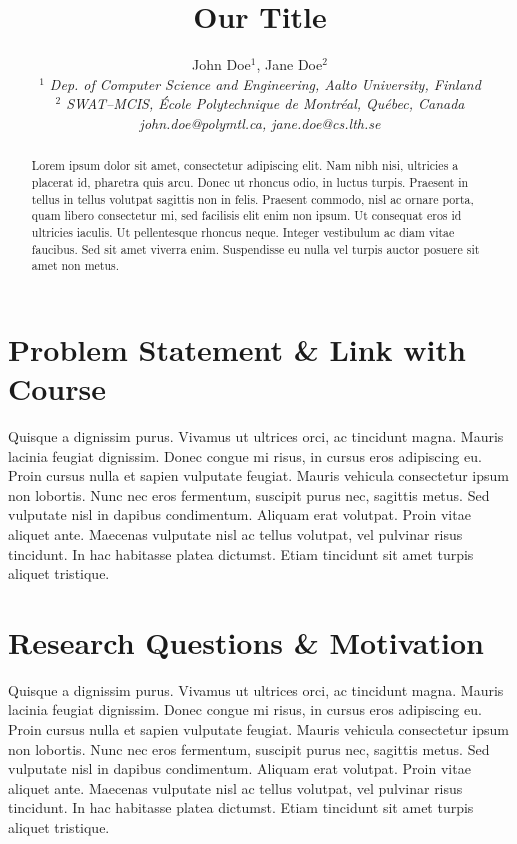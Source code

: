 \documentclass[10pt, conference]{IEEEtran}
\title{Our Title}
\author{John Doe$^{1}$, Jane Doe$^{2}$
    \\
    \emph{$^{1}$ Dep. of Computer Science and Engineering, Aalto University, Finland}
    \\
    \emph{$^{2}$ SWAT--MCIS, \'{E}cole Polytechnique de Montr\'{e}al, Qu\'{e}bec, Canada}
    \\
    \emph{john.doe@polymtl.ca, jane.doe@cs.lth.se}}
\begin{document}
\maketitle

\begin{abstract}
Lorem ipsum dolor sit amet, consectetur adipiscing elit. Nam nibh nisi, ultricies a placerat id, pharetra quis arcu. Donec ut rhoncus odio, in luctus turpis. Praesent in tellus in tellus volutpat sagittis non in felis. Praesent commodo, nisl ac ornare porta, quam libero consectetur mi, sed facilisis elit enim non ipsum. Ut consequat eros id ultricies iaculis. Ut pellentesque rhoncus neque. Integer vestibulum ac diam vitae faucibus. Sed sit amet viverra enim. Suspendisse eu nulla vel turpis auctor posuere sit amet non metus.
\end{abstract}

\section{Problem Statement \& Link with Course}
\label{sec:statement}

Quisque a dignissim purus. Vivamus ut ultrices orci, ac tincidunt magna. Mauris lacinia feugiat dignissim. Donec congue mi risus, in cursus eros adipiscing eu. Proin cursus nulla et sapien vulputate feugiat. Mauris vehicula consectetur ipsum non lobortis. Nunc nec eros fermentum, suscipit purus nec, sagittis metus. Sed vulputate nisl in dapibus condimentum. Aliquam erat volutpat. Proin vitae aliquet ante. Maecenas vulputate nisl ac tellus volutpat, vel pulvinar risus tincidunt. In hac habitasse platea dictumst. Etiam tincidunt sit amet turpis aliquet tristique.

\section{Research Questions \& Motivation}
\label{sec:research-idea}

Quisque a dignissim purus. Vivamus ut ultrices orci, ac tincidunt magna. Mauris lacinia feugiat dignissim. Donec congue mi risus, in cursus eros adipiscing eu. Proin cursus nulla et sapien vulputate feugiat. Mauris vehicula consectetur ipsum non lobortis. Nunc nec eros fermentum, suscipit purus nec, sagittis metus. Sed vulputate nisl in dapibus condimentum. Aliquam erat volutpat. Proin vitae aliquet ante. Maecenas vulputate nisl ac tellus volutpat, vel pulvinar risus tincidunt. In hac habitasse platea dictumst. Etiam tincidunt sit amet turpis aliquet tristique.
\end{document}
